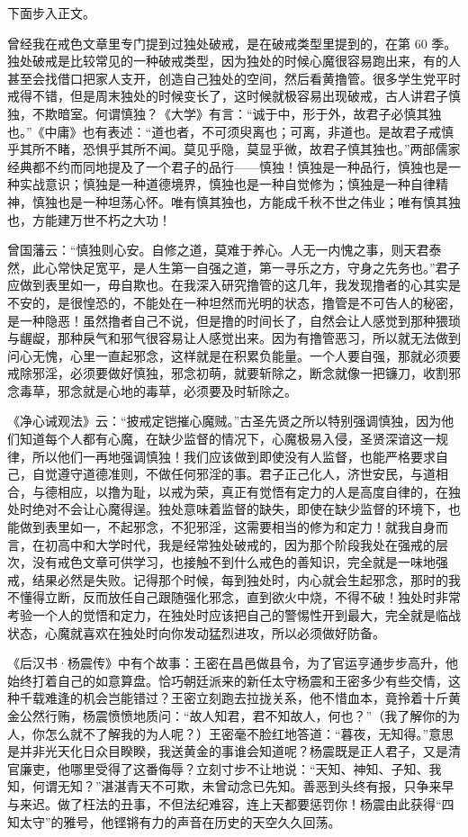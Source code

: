 下面步入正文。

曾经我在戒色文章里专门提到过独处破戒，是在破戒类型里提到的，在第 60 季。独处破戒是比较常见的一种破戒类型，因为独处的时候心魔很容易跑出来，有的人甚至会找借口把家人支开，创造自己独处的空间，然后看黄撸管。很多学生党平时戒得不错，但是周末独处的时候变长了，这时候就极容易出现破戒，古人讲君子慎独，不欺暗室。何谓慎独？《大学》有言：“诚于中，形于外，故君子必慎其独也。”《中庸》也有表述：“道也者，不可须臾离也；可离，非道也。是故君子戒慎乎其所不睹，恐惧乎其所不闻。莫见乎隐，莫显乎微，故君子慎其独也。”两部儒家经典都不约而同地提及了一个君子的品行——慎独！慎独是一种品行，慎独也是一种实战意识；慎独是一种道德境界，慎独也是一种自觉修为；慎独是一种自律精神，慎独也是一种坦荡心怀。唯有慎其独也，方能成千秋不世之伟业；唯有慎其独也，方能建万世不朽之大功！

曾国藩云：“慎独则心安。自修之道，莫难于养心。人无一内愧之事，则天君泰然，此心常快足宽平，是人生第一自强之道，第一寻乐之方，守身之先务也。”君子应做到表里如一，毋自欺也。在我深入研究撸管的这几年，我发现撸者的心其实是不安的，是很惶恐的，不能处在一种坦然而光明的状态，撸管是不可告人的秘密，是一种隐恶！虽然撸者自己不说，但是撸的时间长了，自然会让人感觉到那种猥琐与龌龊，那种戾气和邪气很容易让人感觉出来。因为有撸管恶习，所以就无法做到问心无愧，心里一直起邪念，这样就是在积累负能量。一个人要自强，那就必须要戒除邪淫，必须要做好慎独，邪念初萌，就要斩除之，断念就像一把镰刀，收割邪念毒草，邪念就是心地的毒草，必须要及时斩除之。

《净心诫观法》云：“披戒定铠摧心魔贼。”古圣先贤之所以特别强调慎独，因为他们知道每个人都有心魔，在缺少监督的情况下，心魔极易入侵，圣贤深谙这一规律，所以他们一再地强调慎独！我们应该做到即使没有人监督，也能严格要求自己，自觉遵守道德准则，不做任何邪淫的事。君子正己化人，济世安民，与道相合，与德相应，以撸为耻，以戒为荣，真正有觉悟有定力的人是高度自律的，在独处时绝对不会让心魔得逞。独处意味着监督的缺失，即使在缺少监督的环境下，也能做到表里如一，不起邪念，不犯邪淫，这需要相当的修为和定力！就我自身而言，在初高中和大学时代，我是经常独处破戒的，因为那个阶段我处在强戒的层次，没有戒色文章可供学习，也接触不到什么戒色的善知识，完全就是一味地强戒，结果必然是失败。记得那个时候，每到独处时，内心就会生起邪念，那时的我不懂得立断，反而放任自己跟随强化邪念，直到欲火中烧，不得不破！独处时非常考验一个人的觉悟和定力，在独处时应该把自己的警惕性开到最大，完全就是临战状态，心魔就喜欢在独处时向你发动猛烈进攻，所以必须做好防备。

《后汉书·杨震传》中有个故事：王密在昌邑做县令，为了官运亨通步步高升，他始终打着自己的如意算盘。恰巧朝廷派来的新任太守杨震和王密多少有些交情，这种千载难逢的机会岂能错过？王密立刻跑去拉拢关系，他不惜血本，竟拎着十斤黄金公然行贿，杨震愤愤地质问：“故人知君，君不知故人，何也？”（我了解你的为人，你怎么就不了解我的为人呢？）王密毫不脸红地答道：“暮夜，无知得。”意思是并非光天化日众目睽睽，我送黄金的事谁会知道呢？杨震既是正人君子，又是清官廉吏，他哪里受得了这番侮辱？立刻寸步不让地说：“天知、神知、子知、我知，何谓无知？”湛湛青天不可欺，未曾动念已先知。善恶到头终有报，只争来早与来迟。做了枉法的丑事，不但法纪难容，连上天都要惩罚你！杨震由此获得“四知太守”的雅号，他铿锵有力的声音在历史的天空久久回荡。

